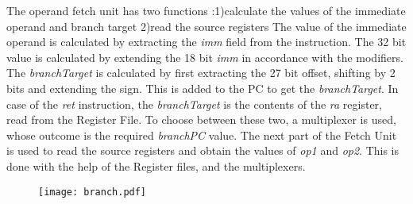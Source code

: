 \begin{ExerciseList}
\Answer
The operand fetch unit has two functions :1)calculate the values of the immediate operand and branch target 2)read the source registers\newline
The value of the immediate operand is calculated by extracting the \textit{imm} field from the instruction. The 32 bit value is calculated by extending the 18 bit \textit{imm} in accordance with the modifiers.\newline
The \textit{branchTarget} is calculated by first extracting the 27 bit offset, shifting by 2 bits and extending the sign. This is added to the PC to get the      \textit{branchTarget}.\newline
In case of the \textit{ret} instruction, the \textit{branchTarget} is the contents of the \textit{ra} register, read from the Register File. To choose between these two, a multiplexer is used, whose outcome is the required \textit{branchPC} value.\newline
The next part of the Fetch Unit is used to read the source registers and obtain the values of \textit{op1} and \textit{op2}. This is done with the help of the Register files, and the multiplexers.

\begin{figure}[H]
  \centering
  \texttt{[image: branch.pdf]}
\end{figure}


\end{ExerciseList}
